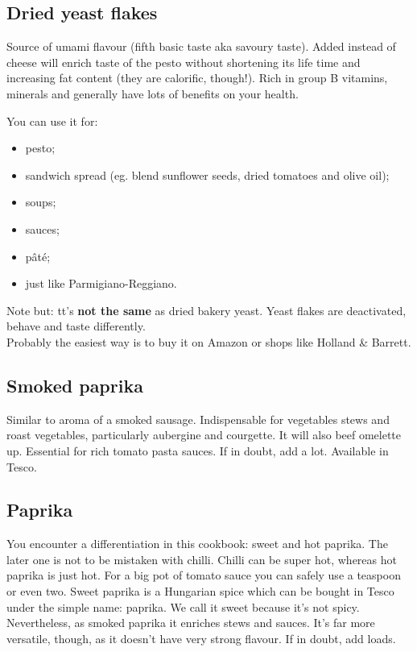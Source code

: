 \subsection*{Dried yeast flakes}

Source of umami flavour (fifth basic taste aka savoury taste).
Added instead of cheese will enrich taste of the pesto without shortening its life time and increasing fat content (they are calorific, though!).
Rich in group B vitamins, minerals and generally have lots of benefits on your health. 

You can use it for:

\begin{itemize}
    \setlength\itemsep{0.1mm}
    \item pesto;
    \item sandwich spread (eg. blend sunflower seeds, dried tomatoes and olive oil);
    \item soups;
    \item sauces; 
    \item pâté;
    \item just like Parmigiano-Reggiano.
\end{itemize}

Note but: tt's \textbf{not the same} as dried bakery yeast.
Yeast flakes are deactivated, behave and taste differently.
\\
Probably the easiest way is to buy it on Amazon or shops like Holland \& Barrett.

\subsection* {Smoked paprika}
Similar to aroma of a smoked sausage.
Indispensable for vegetables stews and roast vegetables, particularly aubergine and courgette.
It will also beef omelette up. 
Essential for rich tomato pasta sauces. If in doubt, add a lot.
Available in Tesco.

\subsection*{Paprika}
You encounter a differentiation in this cookbook: sweet and hot paprika.
The later one is not to be mistaken with chilli.
Chilli can be super hot, whereas hot paprika is just hot.
For a big pot of tomato sauce you can safely use a teaspoon or even two.
Sweet paprika is a Hungarian spice which can be bought in Tesco under the simple name: paprika.
We call it sweet because it's not spicy.
Nevertheless, as smoked paprika it enriches stews and sauces.
It's far more versatile, though, as it doesn't have very strong flavour.
If in doubt, add loads.

